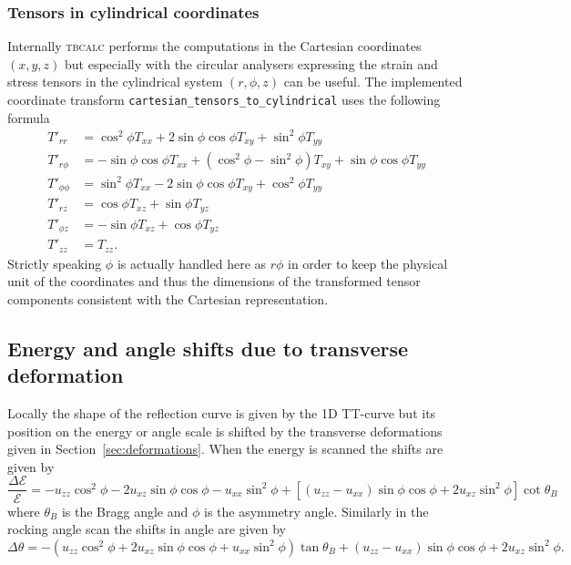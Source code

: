 \documentclass[11pt,a4paper]{article}
\begin{document}
\subsubsection{Tensors in cylindrical coordinates}
Internally \textsc{tbcalc} performs the computations in the Cartesian coordinates $(x,y,z)$ but especially with the circular analysers expressing the strain and stress tensors in the cylindrical system $(r,\phi,z)$ can be useful. The implemented coordinate transform \texttt{cartesian\_tensors\_to\_cylindrical} uses the following formula
\begin{align}
T'_{rr} &=   \cos^2 \phi T_{xx}  + 2 \sin \phi \cos \phi  T_{xy} +  \sin^2 \phi T_{yy} \\
T'_{r \phi} &=  -  \sin \phi \cos \phi T_{xx} + (\cos^2 \phi - \sin^2 \phi) T_{xy} + \sin \phi \cos \phi T_{yy} \\
T'_{\phi \phi} &= \sin^2 \phi T_{xx} - 2 \sin \phi \cos \phi  T_{xy} + \cos^2 \phi T_{yy} \\
T'_{r z} &= \cos \phi T_{xz} + \sin \phi T_{yz} \\
T'_{\phi z} &= - \sin \phi T_{xz} + \cos \phi T_{yz} \\
T'_{z z} &= T_{zz}. 
\end{align}
Strictly speaking $\phi$ is actually handled here as $r \phi$ in order to keep the physical unit of the coordinates and thus the dimensions of the transformed tensor components consistent with the Cartesian representation.

\subsection{Energy and angle shifts due to transverse deformation}
Locally the shape of the reflection curve is given by the 1D TT-curve but its position on the energy or angle scale is shifted by the transverse deformations given in Section~\ref{sec:deformations}. When the energy is scanned the shifts are given by
\begin{equation}
\frac{\Delta \mathcal{E}}{\mathcal{E}} = 
- u_{zz} \cos^2 \phi - 2 u_{xz} \sin \phi \cos \phi
- u_{xx} \sin^2 \phi 
+\left[\left(u_{zz} - u_{xx} \right) \sin \phi \cos \phi + 2 u_{x z} \sin^2 \phi \right] \cot \theta_B
\end{equation}
where $\theta_B$ is the Bragg angle and $\phi$ is the asymmetry angle. Similarly in the rocking angle scan the shifts in angle are given by
\begin{equation}
\Delta \theta = - \left( u_{zz} \cos^2 \phi + 2 u_{xz} \sin \phi \cos \phi
+ u_{xx} \sin^2 \phi \right) \tan \theta_B + \left(u_{zz} - u_{xx} \right) \sin \phi \cos \phi + 2 u_{x z} \sin^2 \phi.
\end{equation}






\end{document}
